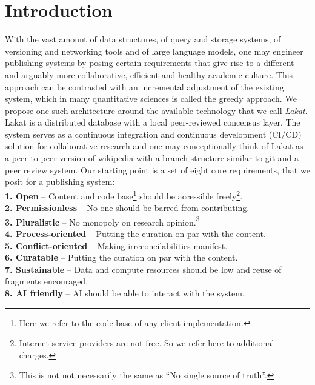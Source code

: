 \documentclass[14pt]{article}
\title{\sc{Lakat}\break \sc{An open pluralistic base layer for 
academic publishing}}
\author{Leonhard Horstmeyer \\
\remark{Do not distribute}}
\date{\today}
\begin{document}
\maketitle

\tableofcontents

\begin{abstract}
    This is abstract for real
\end{abstract}

\newpage
\section{Introduction}

With the vast amount of data structures, of query and storage systems, of versioning and networking tools and of large language models, one may engineer publishing systems by posing certain requirements that give rise to a different and arguably more collaborative, efficient and healthy academic culture. This approach can be contrasted with an incremental adjustment of the existing system, which in many quantitative sciences is called the greedy approach. We propose one such architecture around the available technology that we call \textit{Lakat}.
Lakat is a distributed database with a local peer-reviewed concensus layer. The system serves as a continuous integration and continuous development (CI/CD) solution for collaborative research and one may conceptionally think of Lakat as a peer-to-peer  version of wikipedia with a branch structure similar to git and a peer review system.
Our starting point is a set of eight core requirements, that we posit for a publishing system:\\

\indent \textbf{1. Open} -- 
 Content and code base\footnote{Here we refer to the code base of any client implementation.} should be accessible freely\footnote{Internet service providers are not free. So we refer here to additional charges.}.\\
\indent\textbf{2. Permissionless} --
 No one should be barred from contributing.\\
\indent\textbf{3. Pluralistic} -- No monopoly on research opinion.\footnote{This is not not necessarily the same as ``No single source of truth''.}\\
\indent\textbf{4. Process-oriented} -- Putting the curation on par with the content.\\
\indent\textbf{5. Conflict-oriented} -- Making irreconcilabilities manifest.\\
\indent\textbf{6. Curatable} -- Putting the curation on par with the content.\\
\indent\textbf{7. Sustainable} -- 
 Data and compute resources should be low and reuse of fragments encouraged.\\
\indent\textbf{8. AI friendly} -- AI should be able to interact with the system.\\
\end{document}
